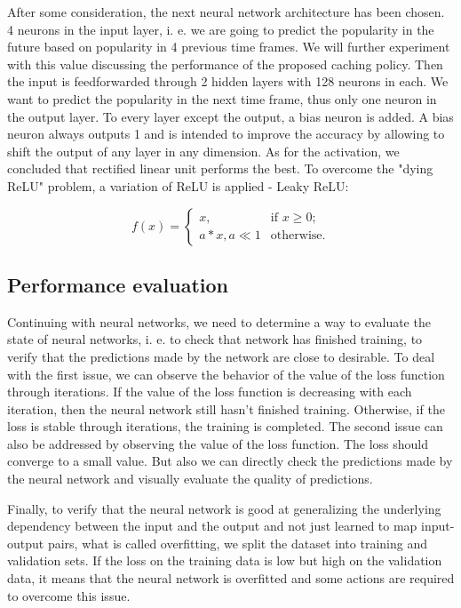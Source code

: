 After some consideration, the next neural network architecture has been chosen. 4 neurons in the input layer, i. e. we are going to predict the popularity in the future based on popularity in 4 previous time frames. We will further experiment with this value discussing the performance of the proposed caching policy. Then the input is feedforwarded through 2 hidden layers with 128 neurons in each. We want to predict the popularity in the next time frame, thus only one neuron in the output layer. To every layer except the output, a bias neuron is added. A bias neuron always outputs 1 and is intended to improve the accuracy by allowing to shift the output of any layer in any dimension. As for the activation, we concluded that rectified linear unit performs the best. To overcome the "dying ReLU"\cite{14} problem, a variation of ReLU is applied - Leaky ReLU:

$$ f(x) = 
	\begin{cases}
	x, & \text{if } x \geq 0; \\
	a*x, a \ll 1 & \text{otherwise.}
	\end{cases}
$$

\subsection{Performance evaluation}

Continuing with neural networks, we need to determine a way to evaluate the state of neural networks, i. e. to check that network has finished training, to verify that the predictions made by the network are close to desirable. To deal with the first issue, we can observe the behavior of the value of the loss function through iterations. If the value of the loss function is decreasing with each iteration, then the neural network still hasn't finished training. Otherwise, if the loss is stable through iterations, the training is completed. The second issue can also be addressed by observing the value of the loss function. The loss should converge to a small value. But also we can directly check the predictions made by the neural network and visually evaluate the quality of predictions.

Finally, to verify that the neural network is good at generalizing the underlying dependency between the input and the output and not just learned to map input-output pairs, what is called overfitting\cite{15}, we split the dataset into training and validation sets. If the loss on the training data is low but high on the validation data, it means that the neural network is overfitted and some actions are required to overcome this issue.

